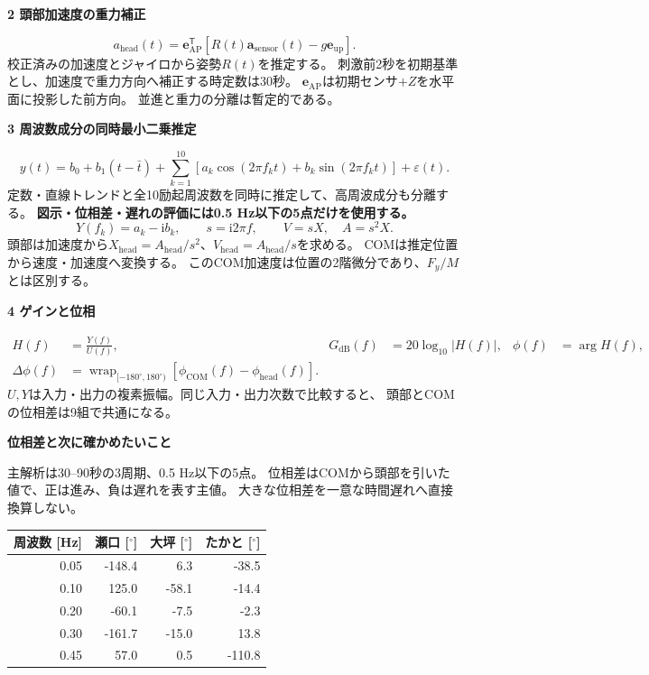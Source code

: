 \documentclass[a4paper,10pt]{ltjsarticle}
\newcommand{\wrap}{\operatorname{wrap}_{[-180^\circ,180^\circ)}}
\newcommand{\ii}{\mathrm{i}}
\newcommand{\COM}{\mathrm{COM}}
\newcommand{\head}{\mathrm{head}}
\newcommand{\sect}[1]{\vspace{4pt}\textbf{\large #1}\par}
\begin{document}
\sect{2 頭部加速度の重力補正}
\begin{equation}
 a_{\head}(t)=\bm e_{\mathrm{AP}}^{\mathsf T}
 \left[R(t)\bm a_{\mathrm{sensor}}(t)-g\bm e_{\mathrm{up}}\right].
\end{equation}
校正済みの加速度とジャイロから姿勢\(R(t)\)を推定する。
刺激前2秒を初期基準とし、加速度で重力方向へ補正する時定数は30秒。
\(\bm e_{\mathrm{AP}}\)は初期センサ\(+Z\)を水平面に投影した前方向。
並進と重力の分離は暫定的である。

\sect{3 周波数成分の同時最小二乗推定}
\begin{equation}
 y(t)=b_0+b_1(t-\bar t)
 +\sum_{k=1}^{10}\left[a_k\cos(2\pi f_kt)+b_k\sin(2\pi f_kt)\right]+\varepsilon(t).
\end{equation}
定数・直線トレンドと全10励起周波数を同時に推定して、高周波成分も分離する。
\textbf{図示・位相差・遅れの評価には0.5 Hz以下の5点だけを使用する。}
\begin{equation}
 Y(f_k)=a_k-\ii b_k,\qquad s=\ii2\pi f,\qquad V=sX,\quad A=s^2X.
\end{equation}
頭部は加速度から\(X_{\head}=A_{\head}/s^2\)、\(V_{\head}=A_{\head}/s\)を求める。
COMは推定位置から速度・加速度へ変換する。
このCOM加速度は位置の2階微分であり、\(F_y/M\)とは区別する。

\sect{4 ゲインと位相}
\begin{align}
 H(f)&=\frac{Y(f)}{U(f)},&
 G_{\mathrm{dB}}(f)&=20\log_{10}|H(f)|,& \phi(f)&=\arg H(f),\\
 \Delta\phi(f)&=\wrap\!\left[\phi_{\COM}(f)-\phi_{\head}(f)\right].&&&
\end{align}
\(U,Y\)は入力・出力の複素振幅。同じ入力・出力次数で比較すると、
頭部とCOMの位相差は9組で共通になる。

\newpage
{\LARGE\bfseries 位相差と次に確かめたいこと}\par
主解析は30--90秒の3周期、0.5 Hz以下の5点。
位相差はCOMから頭部を引いた値で、正は進み、負は遅れを表す主値。
大きな位相差を一意な時間遅れへ直接換算しない。

\begin{center}
\renewcommand{\arraystretch}{1.35}
\begin{tabular}{rrrr}
\toprule
周波数 [Hz] & 瀬口 [$^\circ$] & 大坪 [$^\circ$] & たかと [$^\circ$]\\
\midrule
0.05 & -148.4 & 6.3 & -38.5\\
0.10 & 125.0 & -58.1 & -14.4\\
0.20 & -60.1 & -7.5 & -2.3\\
0.30 & -161.7 & -15.0 & 13.8\\
0.45 & 57.0 & 0.5 & -110.8\\
\bottomrule
\end{tabular}
\end{center}
\end{document}
